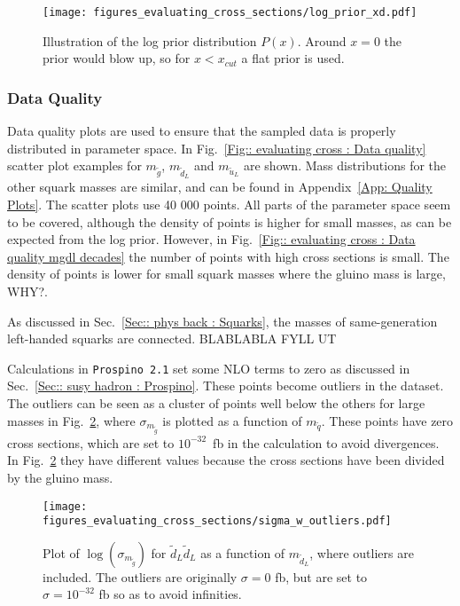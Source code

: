 \documentclass[twoside,english]{uiofysmaster}
\begin{document}
{\begin{figure}
\centering
\texttt{[image: figures\_evaluating\_cross\_sections/log\_prior\_xd.pdf]}
\caption{Illustration of the log prior distribution $P(x)$. Around $x=0$ the prior would blow up, so for $x < x_{cut}$ a flat prior is used.}
\label{Fig:: evaluating cross : prior illustration}
\end{figure}



\subsubsection{Data Quality}\label{Sec:: evaluating cross : Data Quality}


Data quality plots are used to ensure that the sampled data is properly distributed in parameter space. In Fig.~\ref{Fig:: evaluating cross : Data quality} scatter plot examples for $m_{\widetilde{g}}$, $m_{\widetilde{d}_L}$ and $m_{\widetilde{u}_L}$ are shown. Mass distributions for the other squark masses are similar, and can be found in Appendix~\ref{App: Quality Plots}. The scatter plots use 40 000 points. All parts of the parameter space seem to be covered, although the density of points is higher for small masses, as can be expected from the log prior. However, in Fig.~\ref{Fig:: evaluating cross : Data quality mgdl decades} the number of points with high cross sections is small. The density of points is lower for small squark masses where the gluino mass is large, WHY?. 

As discussed in Sec.~\ref{Sec:: phys back : Squarks}, the masses of same-generation left-handed squarks are connected. BLABLABLA FYLL UT

Calculations in \verb|Prospino 2.1| set some NLO terms to zero as discussed in Sec.~\ref{Sec:: susy hadron : Prospino}. These points become outliers in the dataset. The outliers can be seen as a cluster of points well below the others for large masses in Fig.~\ref{Fig:: evaluating cross : sigma w outliers}, where $\sigma_{m_{\widetilde{g}}}$ is plotted as a function of $m_{\widetilde{q}}$. These points have zero cross sections, which are set to $10^{-32}$~fb in the calculation to avoid divergences. In Fig.~\ref{Fig:: evaluating cross : sigma w outliers} they have different values because the cross sections have been divided by the gluino mass.

\begin{figure}
\centering
\texttt{[image: figures\_evaluating\_cross\_sections/sigma\_w\_outliers.pdf]}
\caption{Plot of $\log( \sigma_{m_{\widetilde{g}}})$ for $\widetilde{d}_L \widetilde{d}_L$ as a function of $m_{\widetilde{d}_L}$, where outliers are included. The outliers are originally $\sigma=0$ fb, but are set to $\sigma =10^{-32}$ fb so as to avoid infinities.}
\label{Fig:: evaluating cross : sigma w outliers}
\end{figure}

}
\end{document}
